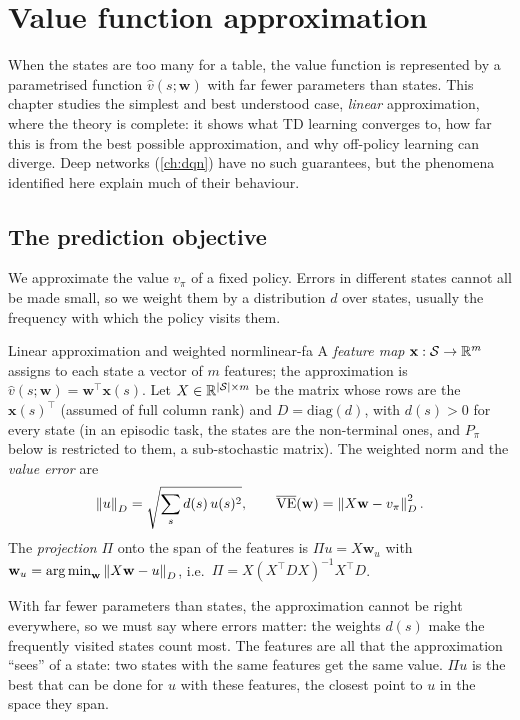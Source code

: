 \chapter{Value function approximation}
\label{ch:vfa}

When the states are too many for a table, the value function is
represented by a parametrised function $\hat v(s; \mathbf{w})$ with far
fewer parameters than states. This chapter studies the simplest and best
understood case, \emph{linear} approximation, where the theory is complete:
it shows what TD learning converges to, how far this is from the best
possible approximation, and why off-policy learning can diverge. Deep
networks (\cref{ch:dqn}) have no such guarantees, but the phenomena
identified here explain much of their behaviour.

\section{The prediction objective}

We approximate the value $v_\pi$ of a fixed policy. Errors in different
states cannot all be made small, so we weight them by a distribution $d$
over states, usually the frequency with which the policy visits them.

\begin{definition}{Linear approximation and weighted norm}{linear-fa}
  A \emph{feature map} $\mathbf{x} : \mathcal{S} \to \mathbb{R}^m$ assigns to each state
  a vector of $m$ features; the approximation is $\hat v(s; \mathbf{w}) =
  \mathbf{w}^\top \mathbf{x}(s)$. Let $X \in \mathbb{R}^{\left\lvert \mathcal{S} \right\rvert \times m}$ be
  the matrix whose rows are the $\mathbf{x}(s)^\top$ (assumed of full column
  rank) and $D = \mathrm{diag}(d)$, with $d(s) > 0$ for every state (in an
  episodic task, the states are the non-terminal ones, and $P_\pi$ below is
  restricted to them, a sub-stochastic matrix). The weighted norm and the
  \emph{value error} are
  \begin{equation}
    \left\lVert u \right\rVert_D = \sqrt{\sum_s d(s)\, u(s)^2}, \qquad
    \overline{\mathrm{VE}}(\mathbf{w}) = \left\lVert X \mathbf{w} - v_\pi \right\rVert_D^2.
  \end{equation}
  The \emph{projection} $\Pi$ onto the span of the features is $\Pi u = X
  \mathbf{w}_u$ with $\mathbf{w}_u = \operatorname*{arg\,min}_{\mathbf{w}} \left\lVert X
  \mathbf{w} - u \right\rVert_D$, i.e.\ $\Pi = X (X^\top D X)^{-1} X^\top D$.
\end{definition}

\begin{intuition}
  With far fewer parameters than states, the approximation cannot be right
  everywhere, so we must say where errors matter: the weights $d(s)$ make
  the frequently visited states count most. The features are all that the
  approximation ``sees'' of a state: two states with the same features get
  the same value. $\Pi u$ is the best that can be done for $u$ with these
  features, the closest point to $u$ in the space they span.
\end{intuition}

